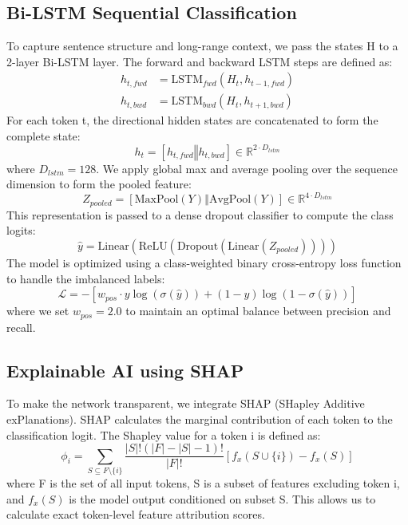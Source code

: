 \documentclass[conference]{IEEEtran}
\begin{document}
\subsection{Bi-LSTM Sequential Classification}
To capture sentence structure and long-range context, we pass the states H to a 2-layer Bi-LSTM layer. The forward and backward LSTM steps are defined as:
\begin{align}
h_{t, fwd} &= \text{LSTM}_{fwd}(H_t, h_{t-1, fwd}) \\
h_{t, bwd} &= \text{LSTM}_{bwd}(H_t, h_{t+1, bwd})
\end{align}
For each token t, the directional hidden states are concatenated to form the complete state:
\begin{equation}
h_t = [h_{t, fwd} \mathbin{\Vert} h_{t, bwd}] \in \mathbb{R}^{2 \cdot D_{lstm}}
\end{equation}
where $D_{lstm} = 128$. We apply global max and average pooling over the sequence dimension to form the pooled feature:
\begin{equation}
Z_{pooled} = [\text{MaxPool}(Y) \mathbin{\Vert} \text{AvgPool}(Y)] \in \mathbb{R}^{4 \cdot D_{lstm}}
\end{equation}
This representation is passed to a dense dropout classifier to compute the class logits:
\begin{equation}
\hat{y} = \text{Linear}(\text{ReLU}(\text{Dropout}(\text{Linear}(Z_{pooled}))))
\end{equation}
The model is optimized using a class-weighted binary cross-entropy loss function to handle the imbalanced labels:
\begin{equation}
\mathcal{L} = - [ w_{pos} \cdot y \log(\sigma(\hat{y})) + (1 - y) \log(1 - \sigma(\hat{y})) ]
\end{equation}
where we set $w_{pos} = 2.0$ to maintain an optimal balance between precision and recall.

\subsection{Explainable AI using SHAP}
To make the network transparent, we integrate SHAP (SHapley Additive exPlanations). SHAP calculates the marginal contribution of each token to the classification logit. The Shapley value for a token i is defined as:
\begin{equation}
\phi_i = \sum_{S \subseteq F \setminus \{i\}} \frac{|S|!(|F| - |S| - 1)!}{|F|!} [ f_x(S \cup \{i\}) - f_x(S) ]
\end{equation}
where F is the set of all input tokens, S is a subset of features excluding token i, and $f_x(S)$ is the model output conditioned on subset S. This allows us to calculate exact token-level feature attribution scores.
\end{document}
